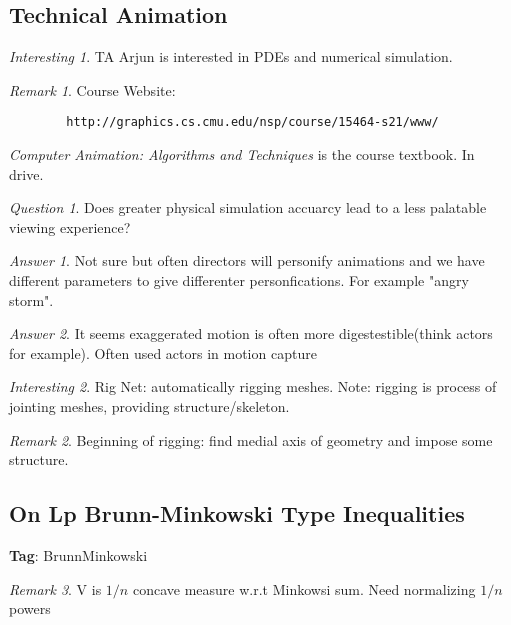 \documentclass[11pt]{article}
\theoremstyle{remark}
\newtheorem{remark}{Remark}
\newtheorem{quest}{Question}
\newtheorem{ans}{Answer}
\newtheorem{interest}{Interesting}
\begin{document}
\subsection{Technical Animation}

\begin{interest}
	TA Arjun is interested in PDEs and numerical simulation.
\end{interest}

\begin{remark}
	Course Website:
	\begin{verbatim}
		http://graphics.cs.cmu.edu/nsp/course/15464-s21/www/
	\end{verbatim}

	\textit{Computer Animation: Algorithms and Techniques} is the course textbook. In drive.
\end{remark}

\begin{quest}
	Does greater physical simulation accuarcy lead to a less palatable viewing experience? 
\end{quest}

\begin{ans}
	Not sure but often directors will personify animations and we have different parameters to give differenter personfications. For example "angry storm".
\end{ans}

\begin{ans}
	It seems exaggerated motion is often more digestestible(think actors for example). Often used actors in motion capture
\end{ans}

\begin{interest}
	Rig Net: automatically rigging meshes. Note: rigging is process of jointing meshes, providing structure/skeleton.
\end{interest}

\begin{remark}
	Beginning of rigging: find medial axis of geometry and impose some structure.
\end{remark}

\subsection{On Lp Brunn-Minkowski Type Inequalities}

\textbf{Tag}: BrunnMinkowski

\begin{remark}
	V is $1/n$ concave measure w.r.t Minkowsi sum. Need normalizing $1/n$ powers 
\end{remark}
\end{document}
